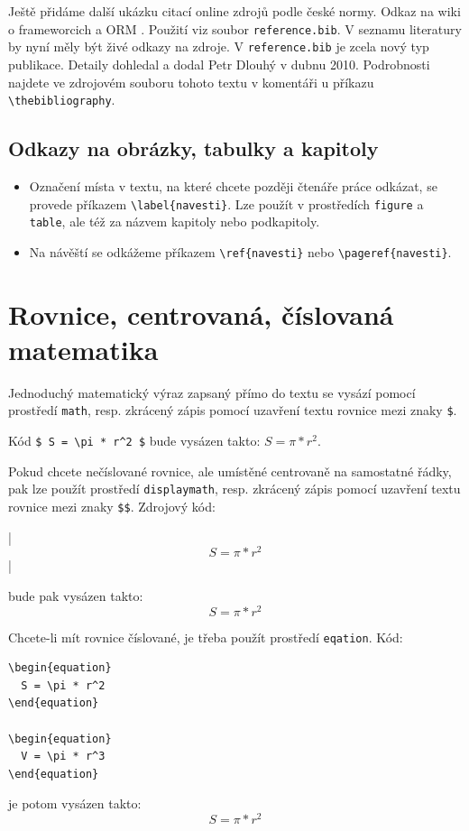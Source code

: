 \documentclass[11pt,oneside,a4paper]{book}
\begin{document}
Ještě přidáme další ukázku citací online zdrojů podle české normy. Odkaz na wiki o frameworcich  a ORM \cite{wiki:orm}. Použití viz soubor \verb|reference.bib|. V seznamu literatury by nyní měly být živé odkazy na zdroje. V \verb|reference.bib| je zcela nový typ publikace. Detaily dohledal a dodal Petr Dlouhý v dubnu 2010. Podrobnosti najdete ve zdrojovém souboru tohoto textu v komentáři u příkazu \verb|\thebibliography|.

\subsection{Odkazy na obrázky, tabulky a kapitoly}
\begin{itemize}
\item Označení místa v textu, na které chcete později čtenáře práce odkázat, se provede příkazem \verb|\label{navesti}|. Lze použít v prostředích \verb|figure| a  \verb|table|, ale též za názvem kapitoly nebo podkapitoly.
\item Na návěští se odkážeme příkazem \verb|\ref{navesti}| nebo \verb|\pageref{navesti}|.
\end{itemize}

\section{Rovnice, centrovaná, číslovaná matematika}
Jednoduchý matematický výraz zapsaný přímo do textu se vysází pomocí prostředí \verb|math|, resp. zkrácený zápis pomocí uzavření textu rovnice mezi znaky \verb|$|.

Kód \verb|$ S = \pi * r^2 $| bude vysázen takto: $ S = \pi * r^2 $.

Pokud chcete nečíslované rovnice, ale umístěné centrovaně na samostatné řádky, pak lze použít prostředí \verb|displaymath|, resp. zkrácený zápis pomocí uzavření textu rovnice mezi znaky \verb|$$|. Zdrojový kód: 
\begin{verb}
|$$ S = \pi * r^2 $$|
\end{verb}
bude pak vysázen takto:
$$ S = \pi * r^2 $$

Chcete-li mít rovnice číslované, je třeba použít prostředí \verb|eqation|. Kód:
\begin{verbatim}
\begin{equation}
  S = \pi * r^2
\end{equation}

\begin{equation}
  V = \pi * r^3
\end{equation}
\end{verbatim}
je potom vysázen takto:
\begin{equation}
  S = \pi * r^2
\end{equation}
\end{document}
